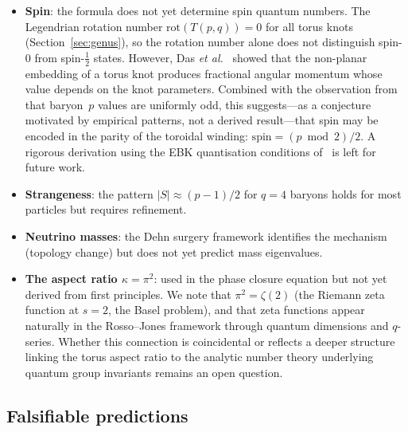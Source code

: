 \documentclass[11pt,a4paper]{article}
\begin{document}
\begin{itemize}
\item \textbf{Spin}: the formula does not yet determine
  spin quantum numbers.  The Legendrian rotation number
  $\mathrm{rot}(T(p,q)) = 0$ for all torus knots
  (Section~\ref{sec:genus}), so the rotation number alone
  does not distinguish spin-0 from spin-$\tfrac{1}{2}$
  states.  However, Das \textit{et al.}~\cite{Das2016}
  showed that the non-planar embedding of a torus knot
  produces fractional angular momentum whose value depends
  on the knot parameters.  Combined with the observation
  from~\cite{paper6} that baryon~$p$ values are uniformly odd,
  this suggests---as a conjecture motivated by empirical
  patterns, not a derived result---that spin may be encoded
  in the parity of the toroidal winding:
  $\mathrm{spin} = (p \bmod 2)/2$.
  A rigorous derivation using the EBK quantisation conditions
  of~\cite{Das2016} is left for future work.
\item \textbf{Strangeness}: the pattern $|S| \approx (p-1)/2$
  for $q = 4$ baryons holds for most particles but requires
  refinement.
\item \textbf{Neutrino masses}: the Dehn surgery framework
  identifies the mechanism (topology change) but does not yet
  predict mass eigenvalues.
\item \textbf{The aspect ratio $\kappa = \pi^2$}: used in
  the phase closure equation but not yet derived from
  first principles.  We note that $\pi^2 = \zeta(2)$
  (the Riemann zeta function at $s = 2$, the Basel
  problem), and that zeta functions appear naturally
  in the Rosso--Jones framework through quantum
  dimensions and $q$-series.  Whether this connection
  is coincidental or reflects a deeper structure linking
  the torus aspect ratio to the analytic number theory
  underlying quantum group invariants remains an open
  question.
\end{itemize}

\subsection{Falsifiable predictions}
\end{document}
